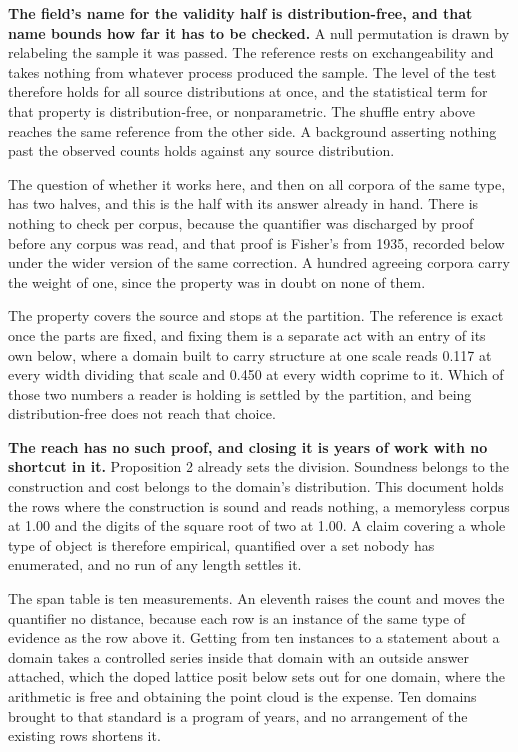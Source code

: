 \textbf{The field's name for the validity half is distribution-free, and that name bounds how far it has to be checked.} A null permutation is drawn by relabeling the sample it was passed. The reference rests on exchangeability and takes nothing from whatever process produced the sample. The level of the test therefore holds for all source distributions at once, and the statistical term for that property is distribution-free, or nonparametric. The shuffle entry above reaches the same reference from the other side. A background asserting nothing past the observed counts holds against any source distribution.

The question of whether it works here, and then on all corpora of the same type, has two halves, and this is the half with its answer already in hand. There is nothing to check per corpus, because the quantifier was discharged by proof before any corpus was read, and that proof is Fisher's from 1935, recorded below under the wider version of the same correction. A hundred agreeing corpora carry the weight of one, since the property was in doubt on none of them.

The property covers the source and stops at the partition. The reference is exact once the parts are fixed, and fixing them is a separate act with an entry of its own below, where a domain built to carry structure at one scale reads 0.117 at every width dividing that scale and 0.450 at every width coprime to it. Which of those two numbers a reader is holding is settled by the partition, and being distribution-free does not reach that choice.

\textbf{The reach has no such proof, and closing it is years of work with no shortcut in it.} Proposition 2 already sets the division. Soundness belongs to the construction and cost belongs to the domain's distribution. This document holds the rows where the construction is sound and reads nothing, a memoryless corpus at 1.00 and the digits of the square root of two at 1.00. A claim covering a whole type of object is therefore empirical, quantified over a set nobody has enumerated, and no run of any length settles it.

The span table is ten measurements. An eleventh raises the count and moves the quantifier no distance, because each row is an instance of the same type of evidence as the row above it. Getting from ten instances to a statement about a domain takes a controlled series inside that domain with an outside answer attached, which the doped lattice posit below sets out for one domain, where the arithmetic is free and obtaining the point cloud is the expense. Ten domains brought to that standard is a program of years, and no arrangement of the existing rows shortens it.

